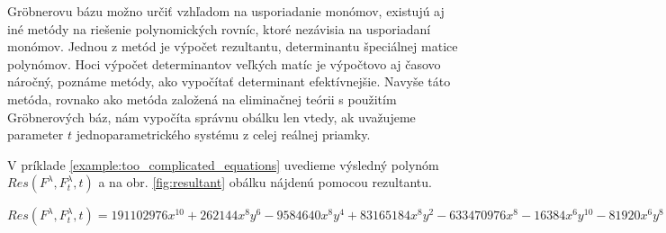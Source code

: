 Gröbnerovu bázu možno určiť vzhľadom na usporiadanie monómov, existujú aj iné metódy na riešenie polynomických rovníc, ktoré nezávisia na usporiadaní monómov. Jednou z metód je výpočet rezultantu, determinantu špeciálnej matice polynómov.
Hoci výpočet determinantov veľkých matíc je výpočtovo aj časovo náročný, poznáme metódy, ako vypočítať determinant efektívnejšie. Navyše táto metóda, rovnako ako metóda založená na eliminačnej teórii s použitím Gröbnerových báz, nám vypočíta správnu obálku len vtedy, ak uvažujeme parameter $t$ jednoparametrického systému z celej reálnej priamky. 



V príklade \ref{example:too_complicated_equations} uvedieme výsledný polynóm $Res(F^\lambda , F_t^\lambda , t)$ a na obr. \ref{fig:resultant} obálku nájdenú pomocou rezultantu. 

$ Res(F^\lambda , F_t^\lambda , t) = 191102976x^{10} + 262144x^8y^6 - 9584640x^8y^4 + 83165184x^8y^2 - 633470976x^8 - 16384x^6y^{10} - 81920x^6y^8 - 14483456x^6y^6 - 113311744x^6y^4 + 96419840x^6y^2 + 698368000x^6 - 16384x^4y^{12} - 294912x^4y^{10} - 2998272x^4y^8 - 18284544x^4y^6 - 74956800x^4y^4 - 184320000x^4y^2 - 256000000x^4. $


